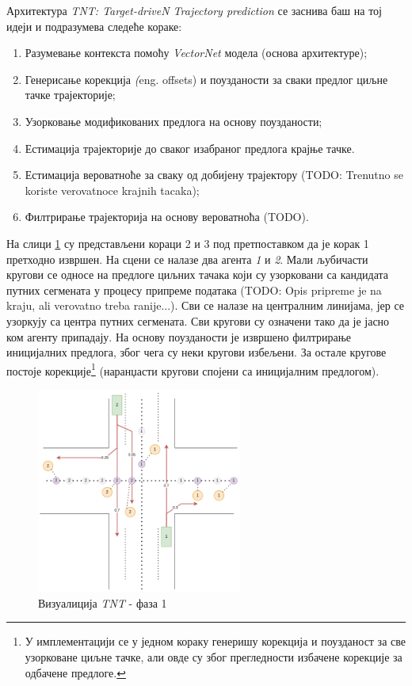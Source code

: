 \documentclass[11pt,oneside]{memoir}
\begin{document}
Архитектура \textit{TNT: Target-driveN Trajectory prediction} \cite{tnt} се заснива баш на тој идеји и подразумева следеће кораке:
\begin{enumerate}
  \item Разумевање контекста помоћу \textit{VectorNet} модела (основа архитектуре);
  \item Генерисање корекција \textit(eng. offsets) и поузданости за сваки предлог циљне тачке трајекторије;
  \item Узорковање модификованих предлога на основу поузданости;
  \item Естимација трајекторије до сваког изабраног предлога крајње тачке.
  \item Естимација вероватноће за сваку од добијену трајектору (TODO: Trenutno se koriste verovatnoce krajnih tacaka);
  \item Филтрирање трајекторија на основу вероватноћа (TODO).
\end{enumerate}

На слици \ref{tnt-viz-1} су представљени кораци 2 и 3 под претпоставком да је корак 1 претходно извршен. На сцени се налазе два агента 
\textit{1} и \textit{2}. Мали љубичасти кругови се односе на предлоге циљних тачака који су узорковани са кандидата путних сегмената
у процесу припреме података (TODO: Opis pripreme je na kraju, ali verovatno treba ranije...). Сви се налазе на централним линијама, 
јер се узоркују са центра путних сегмената. Сви кругови су означени тако да је јасно ком агенту припадају. На основу поузданости је 
извршено филтрирање иницијалних предлога, због чега су неки кругови избељени. За остале кругове постоје корекције\footnote{
  У имплементацији се у једном кораку генеришу корекција и поузданост за све узорковане циљне тачке, али овде су због прегледности
  избачене корекције за одбачене предлоге.
} (наранџасти кругови спојени са иницијалним предлогом).


\begin{figure}[H]
  \centering
  \includegraphics[width=0.6\textwidth]{images/tnt-viz-Page-1.drawio.png}
  \caption{Визуалиција \textit{TNT} - фаза 1 \label{tnt-viz-1}}
\end{figure}
\end{document}
